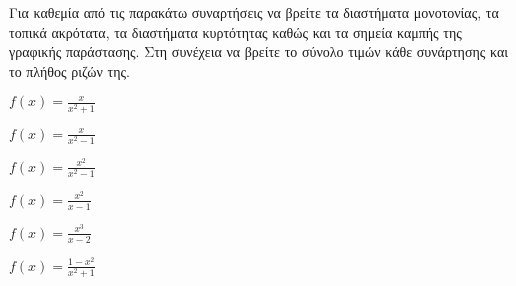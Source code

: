 Για καθεμία από τις παρακάτω συναρτήσεις να βρείτε τα διαστήματα μονοτονίας, τα τοπικά ακρότατα, τα διαστήματα κυρτότητας καθώς και τα σημεία καμπής της γραφικής παράστασης. Στη συνέχεια να βρείτε το σύνολο τιμών κάθε συνάρτησης και το πλήθος ριζών της.
\begin{alist}
\item $ f(x)=\frac{x}{x^2+1} $
\item $ f(x)=\frac{x}{x^2-1} $
\item $ f(x)=\frac{x^2}{x^2-1} $
\item $ f(x)=\frac{x^2}{x-1} $
\item $ f(x)=\frac{x^3}{x-2} $
\item $ f(x)=\frac{1-x^2}{x^2+1} $
\end{alist}
